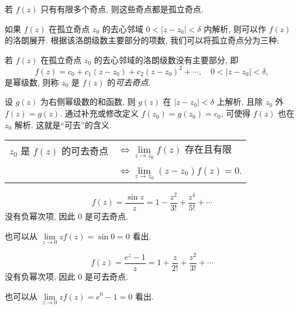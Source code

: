 若 $f(z)$ 只有有限多个奇点, 则这些奇点都是孤立奇点.

如果 $f(z)$ 在孤立奇点 $z_0$ 的去心邻域 $0<|z-z_0|<\delta$ 内解析, 则可以作 $f(z)$ 的洛朗展开.
根据该洛朗级数主要部分的项数, 我们可以将孤立奇点分为三种:

\begin{definition}
	若 $f(z)$ 在孤立奇点 $z_0$ 的去心邻域的洛朗级数没有主要部分, 即
	\[f(z)=c_0+c_1(z-z_0)+c_2(z-z_0)^2+\cdots,\quad 0<|z-z_0|<\delta,\]
	是幂级数, 则称 $z_0$ 是 $f(z)$ 的\emph{可去奇点}.
\end{definition}

设 $g(z)$ 为右侧幂级数的和函数, 则 $g(z)$ 在 $|z-z_0|<\delta$ 上解析,
且除 $z_0$ 外 $f(z)=g(z)$.
通过补充或修改定义 $f(z_0)=g(z_0)=c_0$, 可使得 $f(z)$ 也在 $z_0$ 解析.
这就是``可去''的含义.

\begin{theorem}
	\begin{tabular}{rl}
		$z_0$ 是 $f(z)$ 的可去奇点
		&$\iff\lim\limits_{z\to z_0}f(z)$ 存在且有限\\
		&$\iff\lim\limits_{z\to z_0}(z-z_0)f(z)=0$.
	\end{tabular}
\end{theorem}

\begin{example}
		\[f(z)=\frac{\sin z}z=1-\dfrac{z^2}{3!}+\dfrac{z^4}{5!}+\cdots\]
		没有负幂次项, 因此 $0$ 是可去奇点.

	{也可以从 $\lim\limits_{z\to0}zf(z)=\sin 0=0$ 看出.
	}
\end{example}

\begin{example}
		\[f(z)=\frac{e^z-1}z=1+\dfrac z{2!}+\dfrac{z^2}{3!}+\cdots\]
		没有负幂次项, 因此 $0$ 是可去奇点.

	{也可以从 $\lim\limits_{z\to0}zf(z)=e^0-1=0$ 看出.
	}
\end{example}

